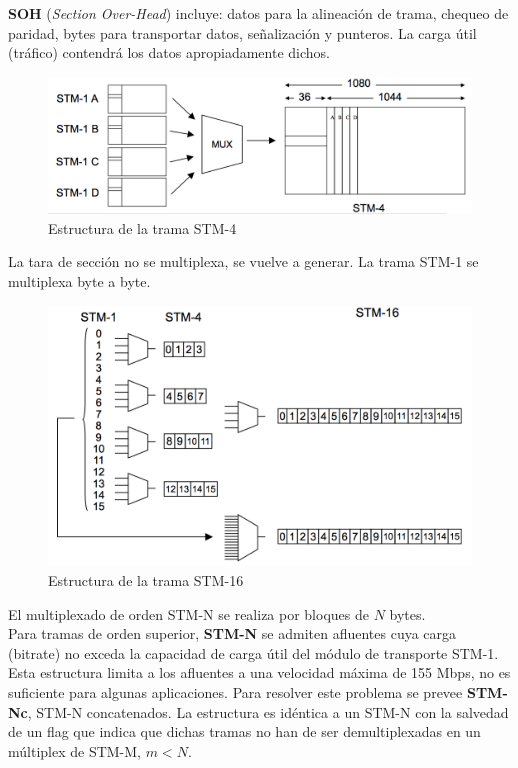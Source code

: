 \documentclass[10pt,portrait, twocolumn]{article}
\begin{document}
\textbf{SOH} (\textit{Section Over-Head}) incluye: datos para la alineación de trama, chequeo de paridad, bytes para transportar datos, señalización y punteros. La carga útil (tráfico) contendrá los datos apropiadamente dichos.

	\begin{figure}[!ht]
 		\centering
  		 \includegraphics[scale = 0.4]{images/STM4}
		\caption{Estructura de la trama STM-4}
	\end{figure}
	
La tara de sección no se multiplexa, se vuelve a generar. La trama STM-1 se multiplexa byte a byte.
	
	\begin{figure}[!ht]
 		\centering
  		 \includegraphics[scale = 0.4]{images/STM16}
		\caption{Estructura de la trama STM-16}
	\end{figure}
		
El multiplexado de orden STM-N se realiza por bloques de $N$ bytes.\\

Para tramas de orden superior, \textbf{STM-N} se admiten afluentes cuya carga (bitrate) no exceda la capacidad de carga útil del módulo de transporte STM-1. Esta estructura limita a los afluentes a una velocidad máxima de 155 Mbps, no es suficiente para algunas aplicaciones. Para resolver este problema se prevee \textbf{STM-Nc}, STM-N concatenados. La estructura es idéntica a un STM-N con la salvedad de un flag que indica que dichas tramas no han de ser demultiplexadas en un múltiplex de STM-M, $m < N$.
	
\end{document}
